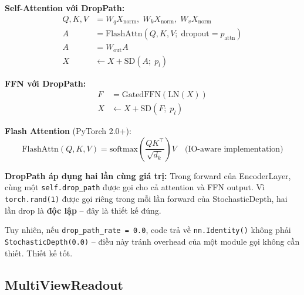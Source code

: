 \documentclass[12pt,a4paper]{article}
\begin{document}
\begin{mathbox}[title={EncoderLayer forward pass đầy đủ}]
\textbf{Self-Attention với DropPath:}
\begin{align}
  Q, K, V &= W_q X_\text{norm},\; W_k X_\text{norm},\; W_v X_\text{norm} \\
  A &= \text{FlashAttn}(Q, K, V;\; \text{dropout}=p_\text{attn}) \\
  A &= W_\text{out} A \\
  X &\leftarrow X + \text{SD}(A;\; p_l) \label{eq:enc_attn}
\end{align}

\textbf{FFN với DropPath:}
\begin{align}
  F &= \text{GatedFFN}(\text{LN}(X)) \\
  X &\leftarrow X + \text{SD}(F;\; p_l) \label{eq:enc_ffn}
\end{align}

\textbf{Flash Attention} (PyTorch 2.0+):
\begin{equation}
  \text{FlashAttn}(Q, K, V) = \text{softmax}\!\left(\frac{QK^\top}{\sqrt{d_k}}\right) V
  \quad \text{(IO-aware implementation)}
\end{equation}
\end{mathbox}

\begin{issuebox}
\textbf{DropPath áp dụng hai lần cùng giá trị:} Trong forward của EncoderLayer,
cùng một \texttt{self.drop\_path} được gọi cho cả attention và FFN output.
Vì \texttt{torch.rand(1)} được gọi riêng trong mỗi lần forward của StochasticDepth,
hai lần drop là \textbf{độc lập} -- đây là thiết kế đúng.

Tuy nhiên, nếu \texttt{drop\_path\_rate = 0.0}, code trả về \texttt{nn.Identity()}
không phải \texttt{StochasticDepth(0.0)} -- điều này tránh overhead của một
module gọi không cần thiết. Thiết kế tốt.
\end{issuebox}

\subsection{MultiViewReadout}
\end{document}
